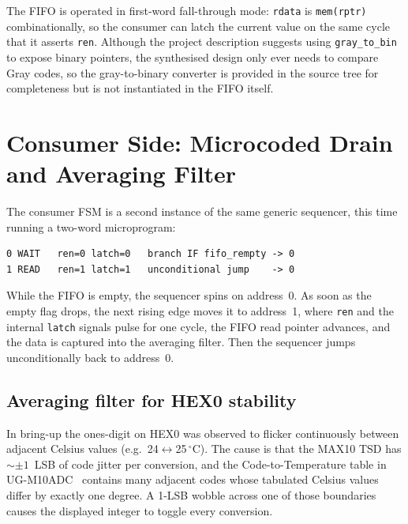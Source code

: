 \documentclass[12pt,letterpaper]{article}
\begin{document}
The FIFO is operated in first-word fall-through mode: \texttt{rdata} is
\texttt{mem(rptr)} combinationally, so the consumer can latch the current
value on the same cycle that it asserts \texttt{ren}.  Although the project
description suggests using \texttt{gray\_to\_bin} to expose binary pointers,
the synthesised design only ever needs to compare Gray codes, so the
gray-to-binary converter is provided in the source tree for completeness but
is not instantiated in the FIFO itself.

\section{Consumer Side: Microcoded Drain and Averaging Filter}
\label{sec:consumer}

The consumer FSM is a second instance of the same generic sequencer, this
time running a two-word microprogram:

\begin{lstlisting}[caption={Consumer microprogram (\texttt{consumer\_fsm.vhd}).}]
0 WAIT   ren=0 latch=0   branch IF fifo_rempty -> 0
1 READ   ren=1 latch=1   unconditional jump    -> 0
\end{lstlisting}

While the FIFO is empty, the sequencer spins on address~0.  As soon as the
empty flag drops, the next rising edge moves it to address~1, where
\texttt{ren} and the internal \texttt{latch} signals pulse for one cycle, the
FIFO read pointer advances, and the data is captured into the averaging
filter.  Then the sequencer jumps unconditionally back to address~0.

\subsection{Averaging filter for HEX0 stability}
\label{sec:filter}

In bring-up the ones-digit on HEX0 was observed to flicker continuously
between adjacent Celsius values (e.g.~24$\leftrightarrow$25\,$^\circ$C).
The cause is that the MAX10 TSD has $\sim\pm 1$~LSB of code jitter per
conversion, and the Code-to-Temperature table in
UG-M10ADC~\cite{ugm10adc} contains many adjacent codes whose tabulated
Celsius values differ by exactly one degree.  A 1-LSB wobble across one of
those boundaries causes the displayed integer to toggle every conversion.
\end{document}
